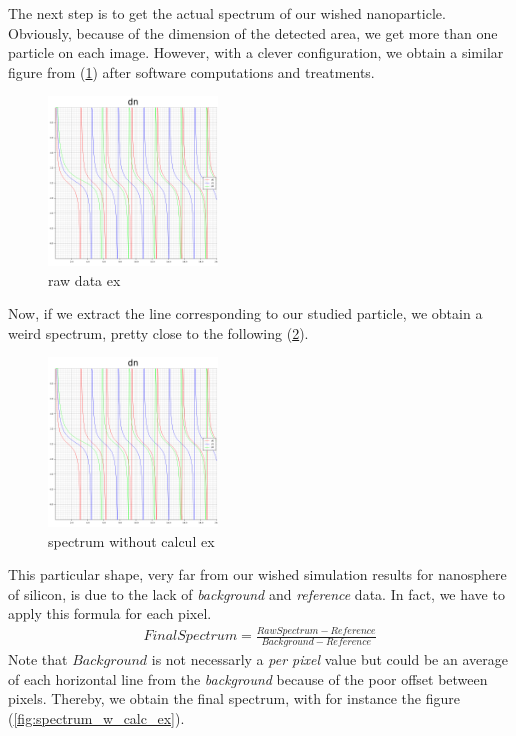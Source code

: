 \documentclass{article}
\numberwithin{equation}{section}
\begin{document}
The next step is to get the actual spectrum of our wished nanoparticle. Obviously, because of the dimension of the detected area, we get more than one particle on each image. However, with a clever configuration, we obtain a similar figure from (\ref{fig:raw_data_ex}) after software computations and treatments.
\begin{figure}[h]
    \centering
    \includegraphics[width=0.4\textwidth, height=0.35\textwidth]{dn.png}
    \caption{raw data ex}
    \label{fig:raw_data_ex}
\end{figure}
Now, if we extract the line corresponding to our studied particle, we obtain a weird spectrum, pretty close to the following (\ref{fig:spectrum_wout_calc_ex}).
\begin{figure}[h]
    \centering
    \includegraphics[width=0.4\textwidth, height=0.35\textwidth]{dn.png}
    \caption{spectrum without calcul ex}
    \label{fig:spectrum_wout_calc_ex}
\end{figure}
This particular shape, very far from our wished simulation results for nanosphere of silicon, is due to the lack of \textit{background} and \textit{reference} data. In fact, we have to apply this formula for each pixel.
\begin{align}
FinalSpectrum = \frac{RawSpectrum - Reference}{Background - Reference}
\end{align}
Note that $Background$ is not necessarly a \textit{per pixel} value but could be an average of each horizontal line from the \textit{background} because of the poor offset between pixels. Thereby, we obtain the final spectrum, with for instance the figure (\ref{fig:spectrum_w_calc_ex}).
\end{document}
